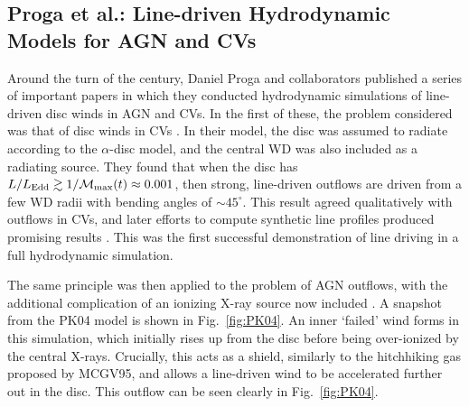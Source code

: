 \subsection{Proga et al.: Line-driven Hydrodynamic Models for AGN and CVs}
\label{sec:proga}
Around the turn of the century, Daniel Proga and collaborators 
published a series of important papers in which they conducted 
hydrodynamic simulations of line-driven disc winds in AGN and CVs. 
In the first of these, the problem considered was that of disc
winds in CVs \citep{proga1998}. In their model, the disc was assumed
to radiate according to the $\alpha$-disc model, and the central WD was also included
as a radiating source. They found that when the disc has 
$L / L_{\mathrm{Edd}} \gtrsim 1 / {\cal M}_{\mathrm{max}} (t) \approx 0.001$, 
then strong, line-driven
outflows are driven from a few WD radii with bending angles of $\sim45^\circ$.
This result agreed qualitatively with outflows in CVs, and later efforts to compute
synthetic line profiles produced promising results \citep{proga2002}. This was the
first successful demonstration of line driving in a full hydrodynamic simulation.

The same principle was then applied to the problem of AGN outflows, with the
additional complication of an ionizing X-ray source now included 
\citep[][hereafter PK04]{PSK2000,PK04}. A snapshot from the PK04 model
is shown in Fig.~\ref{fig:PK04}. An inner `failed' wind forms in this simulation,
which initially rises up from the disc before being over-ionized by the central X-rays.
Crucially, this acts as a shield, similarly to the hitchhiking gas proposed by
MCGV95, and allows a line-driven wind to be accelerated further out in the disc. 
This outflow can be seen clearly in Fig.~\ref{fig:PK04}. 


